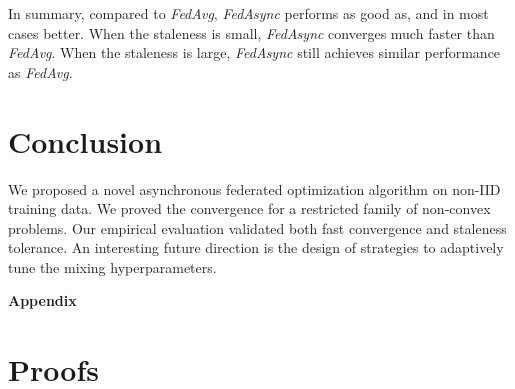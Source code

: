 \documentclass{opt2020} %
\begin{document}
In summary, compared to \textit{FedAvg}, \textit{FedAsync} performs as good as, and in most cases better.
When the staleness is small, \textit{FedAsync} converges much faster than \textit{FedAvg}. When the staleness is large, \textit{FedAsync} still achieves similar performance as \textit{FedAvg}.




\section{Conclusion}

We proposed a novel asynchronous federated optimization algorithm on non-IID training data. We proved the convergence for a restricted family of non-convex problems. Our empirical evaluation validated both fast convergence and staleness tolerance. An interesting future direction is the design of strategies to adaptively tune the mixing hyperparameters.




\newpage
\onecolumn
\appendix
\vspace*{0.1cm}
\begin{center}
	\Large\textbf{Appendix}
\end{center}
\vspace*{0.1cm}

\section{Proofs}

\setcounter{theorem}{0}
\end{document}
